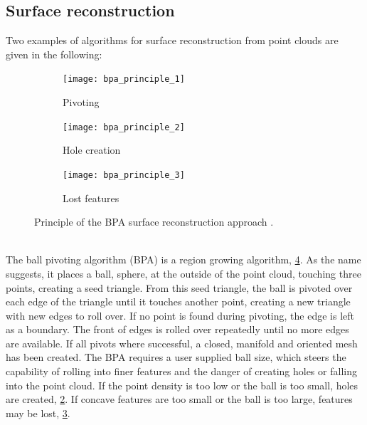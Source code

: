 \subsection{Surface reconstruction}
\label{sec:point_cloud_reconstruction}

Two examples of algorithms for surface reconstruction from point clouds are given in the following:

\begin{description}
	\begin{figure}
		\centering
		\begin{subfigure}[b]{0.30\textwidth}
			\centering
			\texttt{[image: bpa\_principle\_1]}
			\caption{
				Pivoting
			}
			\label{fig:bpa_principle_1}
		\end{subfigure}
		\begin{subfigure}[b]{0.30\textwidth}
			\centering
			\texttt{[image: bpa\_principle\_2]}
			\caption{
				Hole creation
			}
			\label{fig:bpa_principle_2}
		\end{subfigure}
		\begin{subfigure}[b]{0.30\textwidth}
			\centering
			\texttt{[image: bpa\_principle\_3]}
			\caption{
				Lost features
			}
			\label{fig:bpa_principle_3}
		\end{subfigure}
		\caption{
			Principle of the BPA surface reconstruction approach \cite{bpa}.
		}
		\label{fig:bpa_principle}
	\end{figure}

	\item[Ball pivoting algorithm] \hfill \\
	The ball pivoting algorithm (BPA) is a region growing algorithm, \cf \cref{fig:bpa_principle}.
	As the name suggests, it places a ball, \ie sphere, at the outside of the point cloud, touching three points, creating a seed triangle.
	From this seed triangle, the ball is pivoted over each edge of the triangle until it touches another point, creating a new triangle with new edges to roll over.
	If no point is found during pivoting, the edge is left as a boundary.
	The front of edges is rolled over repeatedly until no more edges are available.
	If all pivots where successful, a closed, manifold and oriented mesh has been created.
	The BPA requires a user supplied ball size, which steers the capability of rolling into finer features and the danger of creating holes or falling into the point cloud.
	If the point density is too low or the ball is too small, holes are created, \cf \cref{fig:bpa_principle_2}.
	If concave features are too small or the ball is too large, features may be lost, \cf \cref{fig:bpa_principle_3}.


\end{description}
